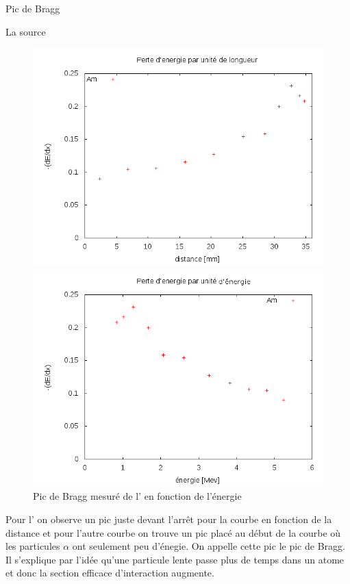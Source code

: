 \documentclass[a4paper,11pt,liststotocnumbered,bibtotocnumbered]{scrartcl}
\begin{document}
\begin{section}{Pic de Bragg}
 \begin{subsection}{La source }
  \begin{figure}[H]
   \begin{minipage}{0.45\textwidth}
    \includegraphics[width=\textwidth]{Bilder/picAm.png}
    \caption{Pic de Bragg mesuré de l'  en fonction de la distance}
   \end{minipage}
   \hfill
   \begin{minipage}{0.45\textwidth}
    \includegraphics[width=\textwidth]{Bilder/picAm2.png}
    \caption{Pic de Bragg mesuré de l'  en fonction de l'énergie}
   \end{minipage}
  \end{figure}
  Pour l' on observe un pic juste devant l'arrêt pour la courbe en fonction de la distance et pour l'autre courbe on trouve un pic placé au début de la courbe où les particules $\alpha$ ont seulement peu d'énegie. On appelle cette pic le pic de Bragg. Il s'explique par l'idée qu'une particule lente passe plus de temps dans un atome et donc la section efficace d'interaction augmente.
 \end{subsection}


\end{section}
\end{document}
